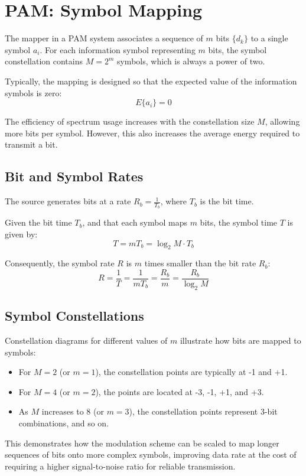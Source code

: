 \section*{PAM: Symbol Mapping}

The mapper in a PAM system associates a sequence of \( m \) bits \( \{d_k\} \) to a single symbol \( a_i \). For each information symbol representing \( m \) bits, the symbol constellation contains \( M = 2^m \) symbols, which is always a power of two.

Typically, the mapping is designed so that the expected value of the information symbols is zero:
\[ E\{a_i\} = 0 \]

The efficiency of spectrum usage increases with the constellation size \( M \), allowing more bits per symbol. However, this also increases the average energy required to transmit a bit.

\subsection*{Bit and Symbol Rates}

The source generates bits at a rate \( R_b = \frac{1}{T_b} \), where \( T_b \) is the bit time.

Given the bit time \( T_b \), and that each symbol maps \( m \) bits, the symbol time \( T \) is given by:
\[ T = mT_b = \log_2 M \cdot T_b \]

Consequently, the symbol rate \( R \) is \( m \) times smaller than the bit rate \( R_b \):
\[ R = \frac{1}{T} = \frac{1}{mT_b} = \frac{R_b}{m} = \frac{R_b}{\log_2 M} \]

\subsection*{Symbol Constellations}

Constellation diagrams for different values of \( m \) illustrate how bits are mapped to symbols:
\begin{itemize}
    \item For \( M = 2 \) (or \( m = 1 \)), the constellation points are typically at -1 and +1.
    \item For \( M = 4 \) (or \( m = 2 \)), the points are located at -3, -1, +1, and +3.
    \item As \( M \) increases to 8 (or \( m = 3 \)), the constellation points represent 3-bit combinations, and so on.
\end{itemize}
This demonstrates how the modulation scheme can be scaled to map longer sequences of bits onto more complex symbols, improving data rate at the cost of requiring a higher signal-to-noise ratio for reliable transmission.


